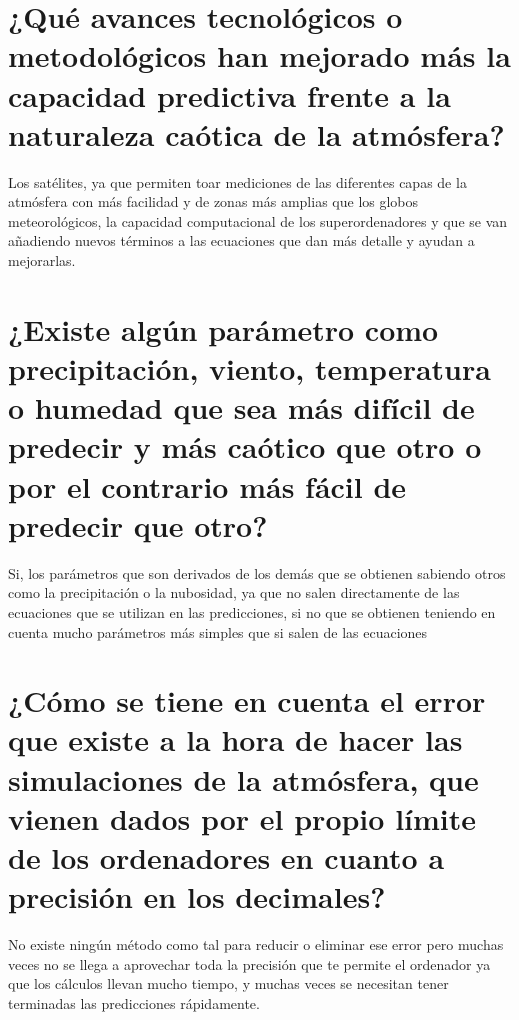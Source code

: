 \documentclass[
  10pt,
  a4paper,
  DIV=11,
  numbers=noendperiod,
  open=any]{scrreprt}
\numberwithin{equation}{chapter}
\numberwithin{equation}{chapter}
\renewcommand{\[}{\begin{equation}}
\renewcommand{\]}{\end{equation}}
\begin{document}
\section{¿Qué avances tecnológicos o metodológicos han mejorado más la
capacidad predictiva frente a la naturaleza caótica de la
atmósfera?}\label{quuxe9-avances-tecnoluxf3gicos-o-metodoluxf3gicos-han-mejorado-muxe1s-la-capacidad-predictiva-frente-a-la-naturaleza-cauxf3tica-de-la-atmuxf3sfera}

Los satélites, ya que permiten toar mediciones de las diferentes capas
de la atmósfera con más facilidad y de zonas más amplias que los globos
meteorológicos, la capacidad computacional de los superordenadores y que
se van añadiendo nuevos términos a las ecuaciones que dan más detalle y
ayudan a mejorarlas.

\section{¿Existe algún parámetro como precipitación, viento, temperatura
o humedad que sea más difícil de predecir y más caótico que otro o por
el contrario más fácil de predecir que
otro?}\label{existe-alguxfan-paruxe1metro-como-precipitaciuxf3n-viento-temperatura-o-humedad-que-sea-muxe1s-difuxedcil-de-predecir-y-muxe1s-cauxf3tico-que-otro-o-por-el-contrario-muxe1s-fuxe1cil-de-predecir-que-otro}

Si, los parámetros que son derivados de los demás que se obtienen
sabiendo otros como la precipitación o la nubosidad, ya que no salen
directamente de las ecuaciones que se utilizan en las predicciones, si
no que se obtienen teniendo en cuenta mucho parámetros más simples que
si salen de las ecuaciones

\section{¿Cómo se tiene en cuenta el error que existe a la hora de hacer
las simulaciones de la atmósfera, que vienen dados por el propio límite
de los ordenadores en cuanto a precisión en los
decimales?}\label{cuxf3mo-se-tiene-en-cuenta-el-error-que-existe-a-la-hora-de-hacer-las-simulaciones-de-la-atmuxf3sfera-que-vienen-dados-por-el-propio-luxedmite-de-los-ordenadores-en-cuanto-a-precisiuxf3n-en-los-decimales}

No existe ningún método como tal para reducir o eliminar ese error pero
muchas veces no se llega a aprovechar toda la precisión que te permite
el ordenador ya que los cálculos llevan mucho tiempo, y muchas veces se
necesitan tener terminadas las predicciones rápidamente.
\end{document}
